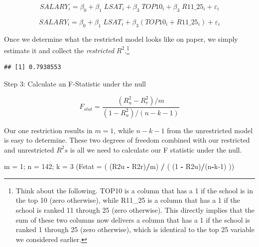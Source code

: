 \documentclass[
]{book}
\newenvironment{Shaded}{\begin{snugshade}}{\end{snugshade}}
\newcommand{\AttributeTok}[1]{\textcolor[rgb]{0.13,0.29,0.53}{#1}}
\newcommand{\DecValTok}[1]{\textcolor[rgb]{0.00,0.00,0.81}{#1}}
\newcommand{\FunctionTok}[1]{\textcolor[rgb]{0.13,0.29,0.53}{\textbf{#1}}}
\newcommand{\NormalTok}[1]{#1}
\newcommand{\OtherTok}[1]{\textcolor[rgb]{0.56,0.35,0.01}{#1}}
\newcommand{\SpecialCharTok}[1]{\textcolor[rgb]{0.81,0.36,0.00}{\textbf{#1}}}
\begin{document}
\[SALARY_i = \beta_0 + \beta_1 \; LSAT_i + \beta_3 \; TOP10_i + \beta_3 \; R11\_25_i + \varepsilon_i\]

\[SALARY_i = \beta_0 + \beta_1 \; LSAT_i + \beta_3 (TOP10_i + R11\_25_i) + \varepsilon_i\]

Once we determine what the restricted model looks like on paper, we simply estimate it and collect the \emph{restricted} \(R^2\).\footnote{Think about the following. TOP10 is a column that has a 1 if the school is in the top 10 (zero otherwise), while R11\_25 is a column that has a 1 if the school is ranked 11 through 25 (zero otherwise). This directly implies that the sum of these two columns now delivers a column that has a 1 if the school is ranked 1 through 25 (zero otherwise), which is identical to the top 25 variable we considered earlier.}

\begin{Shaded}
\end{Shaded}

\begin{verbatim}
## [1] 0.7938553
\end{verbatim}

Step 3: Calculate an F-Statistic under the null

\[F_{stat} = \frac{(R^2_u - R^2_r)/m}{(1-R^2_u)/(n-k-1)}\]

Our one restriction results in \(m=1\), while \(n-k-1\) from the unrestricted model is easy to determine. These two degrees of freedom combined with our restricted and unrestricted \(R^2s\) is all we need to calculate our F statistic under the null.

\begin{Shaded}
\begin{Highlighting}[]
\NormalTok{m }\OtherTok{=} \DecValTok{1}\NormalTok{; n }\OtherTok{=} \DecValTok{142}\NormalTok{; k }\OtherTok{=} \DecValTok{3}
\NormalTok{(}\AttributeTok{Fstat =}\NormalTok{ ( (R2u }\SpecialCharTok{{-}}\NormalTok{ R2r)}\SpecialCharTok{/}\NormalTok{m) }\SpecialCharTok{/}\NormalTok{ ( (}\DecValTok{1} \SpecialCharTok{{-}}\NormalTok{ R2u)}\SpecialCharTok{/}\NormalTok{(n}\SpecialCharTok{{-}}\NormalTok{k}\DecValTok{{-}1}\NormalTok{) ))}
\end{Highlighting}
\end{Shaded}
\end{document}
